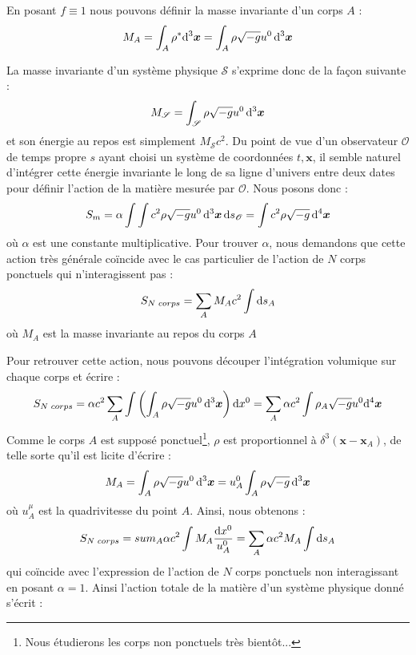 			En posant $f\equiv 1$ nous pouvons définir la masse invariante d'un corps $A$ :
			\begin{equation}
				M_A = \int_A \rho^* \mathrm{d}^3\bm{x} = \int_A \rho \sqrt{-g} u^0 \, \mathrm{d}^3\bm{x}
			\end{equation}

			La masse invariante d'un système physique $\mathscr{S}$ s'exprime donc de la façon suivante :
			\begin{equation}
				M_{\mathscr{S}}=\int_{\mathscr{S}} \rho \sqrt{-g} u^0 \, \mathrm{d}^3\bm{x} 
			\end{equation}
			et son énergie au repos est simplement $M_\mathscr{S}c^2$. Du point de vue d'un observateur $\mathscr{O}$ de temps propre $s$ ayant choisi un système de coordonnées $t,\bm{x}$, il semble naturel d'intégrer cette énergie invariante le long de sa ligne d'univers entre deux dates pour définir l'action de la matière mesurée par $\mathscr{O}$. Nous posons donc :
			\begin{equation}
				S_m = \alpha \int \int c^2 \rho \sqrt{-g} u^0 \, \mathrm{d}^3\bm{x} \, \mathrm{d} s_\mathscr{O} = \int c^2 \rho \sqrt{-g} \, \mathrm{d}^4\bm{x} 
			\end{equation}
			où $\alpha$ est une constante multiplicative. Pour trouver $\alpha$, nous demandons que cette action très générale coïncide avec le cas particulier de l'action de $N$ corps ponctuels qui n'interagissent pas :
			\begin{equation}
				S_{N\phantom{l}corps}=\sum_A M_A c^2 \int \mathrm{d} s_A
			\end{equation}
			où $M_A$ est la masse invariante au repos du corps $A$

			Pour retrouver cette action, nous pouvons découper l'intégration volumique sur chaque corps et écrire :
			\begin{equation}
				S_{N\phantom{l}corps}= \alpha c^2 \sum_A \int \left( \int_A \rho \sqrt{-g} u^0 \, \mathrm{d}^3\bm{x} \right) \mathrm{d} x^0 = \sum_A \alpha c^2 \int \rho_A \sqrt{-g} u^0 \mathrm{d}^4\bm{x}
			\end{equation}
			Comme le corps $A$ est supposé ponctuel\footnote{Nous étudierons les corps non ponctuels très bientôt...}, $\rho$ est proportionnel à $\delta^3(\bm{x}-\bm{x}_A)$, de telle sorte qu'il est licite d'écrire :
			\begin{equation}
				M_A = \int_A \rho \sqrt{-g} u^0 \, \mathrm{d}^3\bm{x} = u^0_A \int_A \rho \sqrt{-g} \, \mathrm{d}^3\bm{x} 
			\end{equation}
			où $u^\mu_A$ est la quadrivitesse du point $A$. Ainsi, nous obtenons :
			\begin{equation}
				S_{N\phantom{l}corps}=sum_A \alpha c^2 \int M_A \frac{\mathrm{d} x^0}{u^0_A} = \sum_A \alpha c^2 M_A \int \mathrm{d} s_A
			\end{equation}
			qui coïncide avec l'expression de l'action de $N$ corps ponctuels non interagissant en posant $\alpha=1$.
			Ainsi l'action totale de la matière d'un système physique donné s'écrit :
\fi

